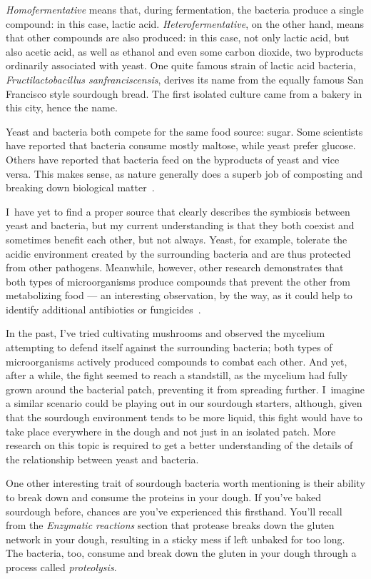 \emph{Homofermentative} means that, during fermentation, the bacteria produce
a single compound: in this case, lactic acid. \emph{Heterofermentative}, on
the other hand, means that other compounds are also produced: in this case,
not only lactic acid, but also acetic acid, as well as ethanol and even some
carbon dioxide, two byproducts ordinarily associated with yeast. One quite
famous strain of lactic acid bacteria, \emph{Fructilactobacillus sanfranciscensis},
derives its name from the equally famous San Francisco style sourdough bread.
The first isolated culture came from a bakery in this city, hence the name.

Yeast and bacteria both compete for the same food source: sugar. Some scientists
have reported that bacteria consume mostly maltose, while yeast prefer glucose.
Others have reported that bacteria feed on the byproducts of yeast and vice
versa. This makes sense, as nature generally does a superb job of composting
and breaking down biological matter~\cite{lactobacillus+sanfrancisco}.

I~have yet to find a proper source that clearly describes the symbiosis between
yeast and bacteria, but my current understanding is that they both coexist and
sometimes benefit each other, but not always. Yeast, for example, tolerate the
acidic environment created by the surrounding bacteria and are thus protected
from other pathogens. Meanwhile, however, other research demonstrates that both
types of microorganisms produce compounds that prevent the other from
metabolizing food --- an interesting observation, by the way, as it could help to
identify additional antibiotics or fungicides~\cite{mold+lactic+acid+bacteria}.

In the past, I've tried cultivating mushrooms and observed the mycelium
attempting to defend itself against the surrounding bacteria; both types of
microorganisms actively produced compounds to combat each other. And yet,
after a while, the fight seemed to reach a standstill, as the mycelium had
fully grown around the bacterial patch, preventing it from spreading further.
I~imagine a similar scenario could be playing out in our sourdough starters,
although, given that the sourdough environment tends to be more liquid, this
fight would have to take place everywhere in the dough and not just in an
isolated patch. More research on this topic is required to get a better understanding of
the details of the relationship between yeast and bacteria.


One other interesting trait of sourdough bacteria worth mentioning is their
ability to break down and consume the proteins in your dough. If you've baked
sourdough before, chances are you've experienced this firsthand. You'll recall
from the \emph{Enzymatic reactions} section that protease breaks down the
gluten network in your dough, resulting in a sticky mess if left unbaked for
too long. The bacteria, too, consume and break down the gluten in your
dough through a process called \emph{proteolysis}.

